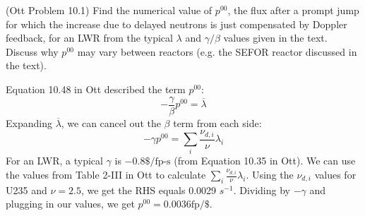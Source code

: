 \documentclass[11pt,addpoints,answers]{exam}
\begin{document}
\begin{questions}

        
        \question[30] (Ott Problem 10.1) Find the numerical value of $p^{00}$, 
        the flux after a prompt jump for which the increase due to delayed 
        neutrons is just compensated by Doppler feedback, for an LWR from the 
        typical $\lambda$ and $\gamma/\beta$ values given in the text. Discuss 
        why $p^{00}$ may vary between reactors (e.g. the SEFOR reactor 
        discussed in the text).

        \begin{solution}
            Equation 10.48 in Ott described the term $p^{00}$:
            \begin{equation}
                -\frac{\gamma}{\beta} p^{00} = \overline{\lambda}
            \end{equation}
            Expanding $\overline{\lambda}$, we can cancel out the $\beta$ term
            from each side:
            \begin{equation}
                -\gamma p^{00} = \sum_{i} \frac{\nu_{d,i}}{\nu} \lambda_{i}
            \end{equation}
            For an LWR, a typical $\gamma$ is $-0.8\$/\text{fp-s}$ (from
            Equation 10.35 in Ott). We can use the values from Table 2-III in
            Ott to calculate $\sum_{i} \frac{\nu_{d,i}}{\nu}
            \lambda_{i}$. Using the $\nu_{d,i}$ values for U235 and $\nu = 2.5$,
            we get the RHS equals 0.0029 $s^{-1}$. Dividing by $-\gamma$ and
            plugging in our values, we get $p^{00} = 0.0036 \text{fp/\$}$.


\end{solution}
\end{questions}
\end{document}
